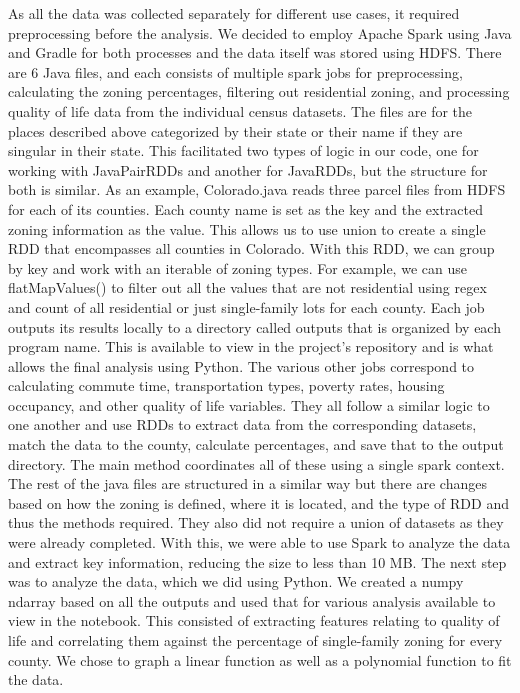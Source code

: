 \documentclass[titlepage]{article}
\begin{document}
As all the data was collected separately for different use cases, it required preprocessing before the analysis. We decided to employ Apache Spark using Java and Gradle for both processes and the data itself was stored using HDFS. There are 6 Java files, and each consists of multiple spark jobs for preprocessing, calculating the zoning percentages, filtering out residential zoning, and processing quality of life data from the individual census datasets. The files are for the places described above categorized by their state or their name if they are singular in their state. This facilitated two types of logic in our code, one for working with JavaPairRDDs and another for JavaRDDs, but the structure for both is similar. As an example, Colorado.java reads three parcel files from HDFS for each of its counties. Each county name is set as the key and the extracted zoning information as the value. This allows us to use union to create a single RDD that encompasses all counties in Colorado. With this RDD, we can group by key and work with an iterable of zoning types. For example, we can use flatMapValues() to filter out all the values that are not residential using regex and count of all residential or just single-family lots for each county. Each job outputs its results locally to a directory called outputs that is organized by each program name. This is available to view in the project's repository and is what allows the final analysis using Python. The various other jobs correspond to calculating commute time, transportation types, poverty rates, housing occupancy, and other quality of life variables. They all follow a similar logic to one another and use RDDs to extract data from the corresponding datasets, match the data to the county, calculate percentages, and save that to the output directory. The main method coordinates all of these using a single spark context. The rest of the java files are structured in a similar way but there are changes based on how the zoning is defined, where it is located, and the type of RDD and thus the methods required. They also did not require a union of datasets as they were already completed. With this, we were able to use Spark to analyze the data and extract key information, reducing the size to less than 10 MB. The next step was to analyze the data, which we did using Python. We created a numpy ndarray based on all the outputs and used that for various analysis available to view in the notebook. This consisted of extracting features relating to quality of life and correlating them against the percentage of single-family zoning for every county. We chose to graph a linear function as well as a polynomial function to fit the data.
\end{document}
